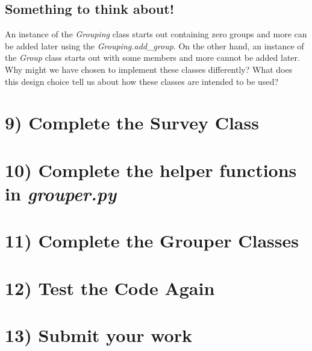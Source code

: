 \documentclass[12pt]{article}
\begin{document}
\subsection*{Something to think about!}
An instance of the \textit{Grouping} class starts out containing zero groups and
more can be added later using the \textit{Grouping.add\_group}. On the other
hand, an instance of the \textit{Group} class starts out with some members and more cannot
be added later. Why might we have chosen to implement these classes differently?
What does this design choice tell us about how these classes are intended to be used?

\section*{9) Complete the Survey Class}

\section*{10) Complete the helper functions in \textit{grouper.py}}

\section*{11) Complete the Grouper Classes}

\section*{12) Test the Code Again}

\section*{13) Submit your work}
\end{document}
